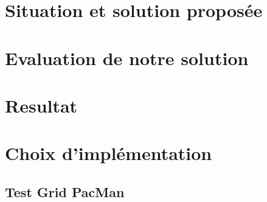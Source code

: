 \documentclass{article}
\begin{document}
%

\tableofcontents \label{contents}


\section{Situation et solution proposée}

\section{Evaluation de notre solution}

\section{Resultat}

\section{Choix d'implémentation}

\subsection{Test Grid PacMan}

\noindent
{}


\end{document}
